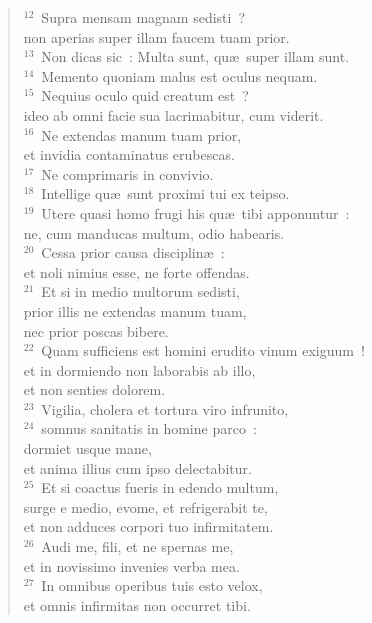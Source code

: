 \begin{flushleft}\begin{verse}${}^{12}$~Supra mensam magnam sedisti~?\\ non aperias super illam faucem tuam prior.\\
${}^{13}$~Non dicas sic~: Multa sunt, qu\ae\ super illam sunt.\\
${}^{14}$~Memento quoniam malus est oculus nequam.\\
${}^{15}$~Nequius oculo quid creatum est~?\\ ideo ab omni facie sua lacrimabitur, cum viderit.\\
${}^{16}$~Ne extendas manum tuam prior,\\ et invidia contaminatus erubescas.\\
${}^{17}$~Ne comprimaris in convivio.\\
${}^{18}$~Intellige qu\ae\ sunt proximi tui ex teipso.\\
${}^{19}$~Utere quasi homo frugi his qu\ae\ tibi apponuntur~:\\ ne, cum manducas multum, odio habearis.\\
${}^{20}$~Cessa prior causa disciplin\ae~:\\ et noli nimius esse, ne forte offendas.\\
${}^{21}$~Et si in medio multorum sedisti,\\ prior illis ne extendas manum tuam,\\ nec prior poscas bibere.\\
${}^{22}$~Quam sufficiens est homini erudito vinum exiguum~!\\ et in dormiendo non laborabis ab illo,\\ et non senties dolorem.\\
${}^{23}$~Vigilia, cholera et tortura viro infrunito,\\
${}^{24}$~somnus sanitatis in homine parco~:\\ dormiet usque mane,\\ et anima illius cum ipso delectabitur.\\
${}^{25}$~Et si coactus fueris in edendo multum,\\ surge e medio, evome, et refrigerabit te,\\ et non adduces corpori tuo infirmitatem.\\
${}^{26}$~Audi me, fili, et ne spernas me,\\ et in novissimo invenies verba mea.\\
${}^{27}$~In omnibus operibus tuis esto velox,\\ et omnis infirmitas non occurret tibi.\\

\end{verse}
\end{flushleft}
